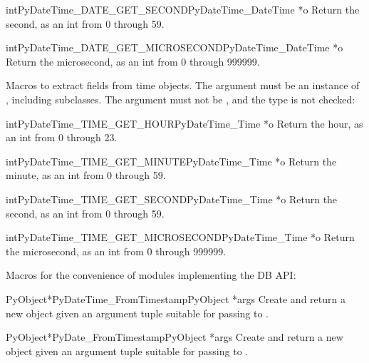 \begin{cfuncdesc}{int}{PyDateTime_DATE_GET_SECOND}{PyDateTime_DateTime *o}
  Return the second, as an int from 0 through 59.
\end{cfuncdesc}

\begin{cfuncdesc}{int}{PyDateTime_DATE_GET_MICROSECOND}{PyDateTime_DateTime *o}
  Return the microsecond, as an int from 0 through 999999.
\end{cfuncdesc}

Macros to extract fields from time objects.  The argument must be an
instance of , including subclasses.
The argument must not be \NULL{}, and the type is not checked:

\begin{cfuncdesc}{int}{PyDateTime_TIME_GET_HOUR}{PyDateTime_Time *o}
  Return the hour, as an int from 0 through 23.
\end{cfuncdesc}

\begin{cfuncdesc}{int}{PyDateTime_TIME_GET_MINUTE}{PyDateTime_Time *o}
  Return the minute, as an int from 0 through 59.
\end{cfuncdesc}

\begin{cfuncdesc}{int}{PyDateTime_TIME_GET_SECOND}{PyDateTime_Time *o}
  Return the second, as an int from 0 through 59.
\end{cfuncdesc}

\begin{cfuncdesc}{int}{PyDateTime_TIME_GET_MICROSECOND}{PyDateTime_Time *o}
  Return the microsecond, as an int from 0 through 999999.
\end{cfuncdesc}

Macros for the convenience of modules implementing the DB API:

\begin{cfuncdesc}{PyObject*}{PyDateTime_FromTimestamp}{PyObject *args}
  Create and return a new  object given an argument
  tuple suitable for passing to .
\end{cfuncdesc}

\begin{cfuncdesc}{PyObject*}{PyDate_FromTimestamp}{PyObject *args}
  Create and return a new  object given an argument
  tuple suitable for passing to .
\end{cfuncdesc}


